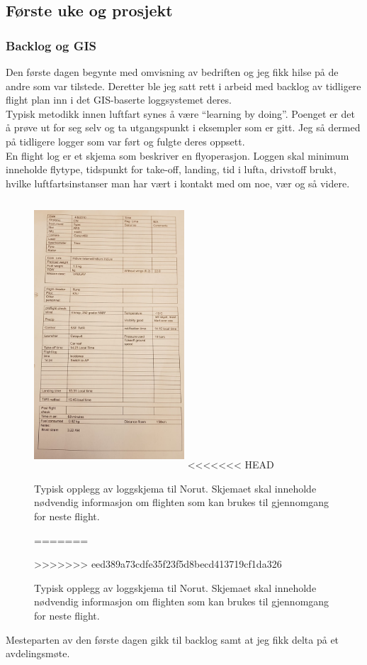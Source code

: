 \documentclass[12pt, a4paper]{article}
\begin{document}
\subsection{Første uke og prosjekt}
\subsubsection{Backlog og GIS}
Den første dagen begynte med omvisning av bedriften og jeg fikk hilse på de andre som var tilstede. Deretter ble jeg satt rett i arbeid med backlog av tidligere flight plan inn i det GIS-baserte loggsystemet deres. \\
Typisk metodikk innen luftfart synes å være ``learning by doing''. Poenget er det å prøve ut for seg selv og ta utgangspunkt i eksempler som er gitt. Jeg så dermed på tidligere logger som var ført og fulgte deres oppsett.\\
En flight log er et skjema som beskriver en flyoperasjon. Loggen skal minimum inneholde flytype, tidspunkt for take-off, landing, tid i lufta, drivstoff brukt, hvilke luftfartsinstanser man har vært i kontakt med om noe, vær og så videre. 

\begin{figure}[ht]
	\centering
	\includegraphics[height= 10cm, width=0.5\textwidth]{bilder/flightlogNorut.png}
<<<<<<< HEAD
		\caption{Typisk opplegg av loggskjema til Norut. Skjemaet skal inneholde nødvendig informasjon om flighten som kan brukes til gjennomgang for neste flight.}
=======
		\caption[Loggskjema]{Typisk opplegg av loggskjema til Norut. Skjemaet skal inneholde nødvendig informasjon om flighten som kan brukes til gjennomgang for neste flight. }
>>>>>>> eed389a73cdfe35f23f5d8becd413719cf1da326
\end{figure}
\newpage
Mesteparten av den første dagen gikk til backlog samt at jeg fikk delta på et avdelingsmøte.\\
\end{document}
